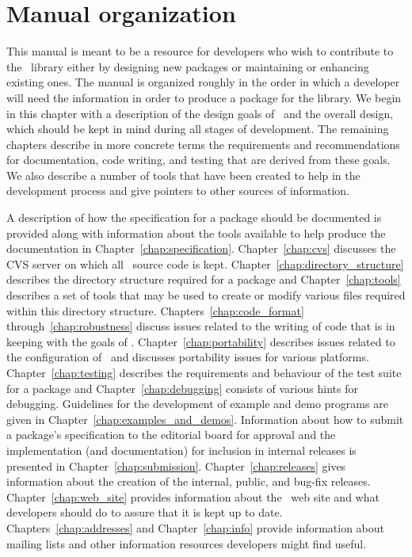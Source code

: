 \section{Manual organization}
\label{sec:manual_org}

This manual is meant to be a resource for developers who wish to contribute
to the \cgal\ library either by designing new packages or maintaining
or enhancing existing ones. The manual is organized roughly in the order in
which a developer will need the information in order to produce a package
for the library. We begin in this chapter with a description 
of the design goals of \cgal\ and the overall design, which should be kept 
in mind during all stages of development.  The remaining chapters describe 
in more concrete terms the requirements and recommendations for documentation, 
code writing, and testing that are derived from these goals.  We also describe 
a number of tools that have been created to help in the development process 
and give pointers to other sources of information.

A description of how the specification 
for a package should be documented is provided along with information about
the tools available to help produce the documentation  
in Chapter~\ref{chap:specification}.
Chapter~\ref{chap:cvs} discusses the CVS server on which all \cgal\ source
code is kept.
Chapter~\ref{chap:directory_structure} describes the directory structure 
required for a package and Chapter~\ref{chap:tools} describes a set of tools 
that may be used to create or modify various files required within this 
directory structure. Chapters~\ref{chap:code_format} 
through~\ref{chap:robustness}
discuss issues related to the writing of code that is in keeping with
the goals of \cgal.  Chapter~\ref{chap:portability} describes issues
related to the configuration of \cgal\ and 
discusses portability issues for various platforms. Chapter~\ref{chap:testing} 
describes the requirements and behaviour of the test suite for a package and 
Chapter~\ref{chap:debugging} consists of various hints for debugging.
Guidelines for the development of example and demo programs are given in
Chapter~\ref{chap:examples_and_demos}. Information 
about how to submit a package's specification to the editorial board 
for approval and the implementation (and documentation) for inclusion in 
internal releases is presented in  Chapter~\ref{chap:submission}.
Chapter~\ref{chap:releases} gives information about the creation of the
internal, public, and bug-fix releases.  Chapter~\ref{chap:web_site}
provides information about the \cgal\ web site and what developers should
do to assure that it is kept up to date.
Chapters~\ref{chap:addresses} and Chapter~\ref{chap:info} 
provide information about mailing lists and other information 
resources developers might find useful.
